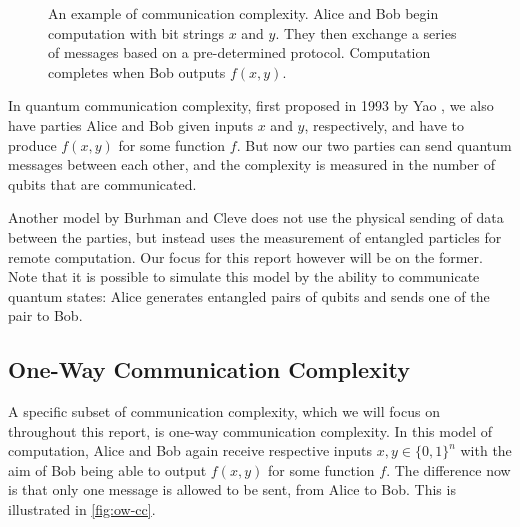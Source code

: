 \documentclass[a4paper]{article}
\begin{document}
        \begin{figure}[t]
            \centering
            \caption{An example of communication complexity. Alice and Bob begin computation with bit strings $x$ and $y$. They then exchange a series of messages based on a pre-determined protocol. Computation completes when Bob outputs $f(x, y)$.}
            \label{fig:cc}
        \end{figure}

        In quantum communication complexity, first proposed in 1993 by Yao \cite{366852}, we also have parties Alice and Bob given inputs $x$ and $y$, respectively, and have to produce $f(x, y)$ for some function $f$. But now our two parties can send quantum messages between each other, and the complexity is measured in the number of qubits that are communicated.

        Another model by Burhman and Cleve \cite{quant-ph/9704026} does not use the physical sending of data between the parties, but instead uses the measurement of entangled particles for remote computation. Our focus for this report however will be on the former. Note that it is possible to simulate this model by the ability to communicate quantum states: Alice generates entangled pairs of qubits and sends one of the pair to Bob.

        \subsection{One-Way Communication Complexity}

        A specific subset of communication complexity, which we will focus on throughout this report, is one-way communication complexity. In this model of computation, Alice and Bob again receive respective inputs $x, y \in \{0, 1\}^n$ with the aim of Bob being able to output $f(x, y)$ for some function $f$. The difference now is that only one message is allowed to be sent, from Alice to Bob. This is illustrated in \ref{fig:ow-cc}.
\end{document}
